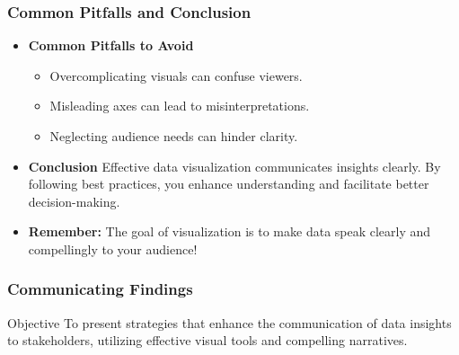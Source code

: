 \documentclass[aspectratio=169]{beamer}
\begin{document}
\begin{frame}[fragile]
    \frametitle{Common Pitfalls and Conclusion}
    \begin{itemize}
        \item \textbf{Common Pitfalls to Avoid}
        \begin{itemize}
            \item Overcomplicating visuals can confuse viewers.
            \item Misleading axes can lead to misinterpretations.
            \item Neglecting audience needs can hinder clarity.
        \end{itemize}

        \item \textbf{Conclusion}
        Effective data visualization communicates insights clearly. By following best practices, you enhance understanding and facilitate better decision-making.

        \item \textbf{Remember:}
        The goal of visualization is to make data speak clearly and compellingly to your audience!
    \end{itemize}
\end{frame}

\begin{frame}[fragile]
    \frametitle{Communicating Findings}
    \begin{block}{Objective}
        To present strategies that enhance the communication of data insights to stakeholders, utilizing effective visual tools and compelling narratives.
    \end{block}
\end{frame}
\end{document}
